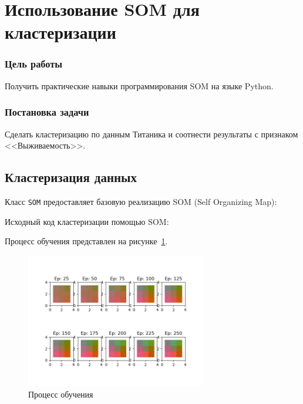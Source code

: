 



\newcommand{\labnumber}{4}



\graphicspath{{figures/}}


\Russian


\addtocounter{page}{1}

\section*{Использование SOM для кластеризации}
\subsubsection*{Цель работы}
Получить практические навыки программирования SOM на языке Python.
\subsubsection*{Постановка задачи}
Сделать кластеризацию по данным Титаника и соотнести результаты с признаком <<Выживаемость>>.

\subsection*{Кластеризация данных}
Класс \texttt{SOM} предоставляет базовую реализацию SOM (Self Organizing Map):


Исходный код кластеризации помощью SOM:  


Процесс обучения представлен на рисунке~\ref{fig:learning_process}.

\begin{figure}[H]
    \centering
        \includegraphics[width=0.7\textwidth]{learning_process}
    \caption{Процесс обучения}
    \label{fig:learning_process}
\end{figure} 

